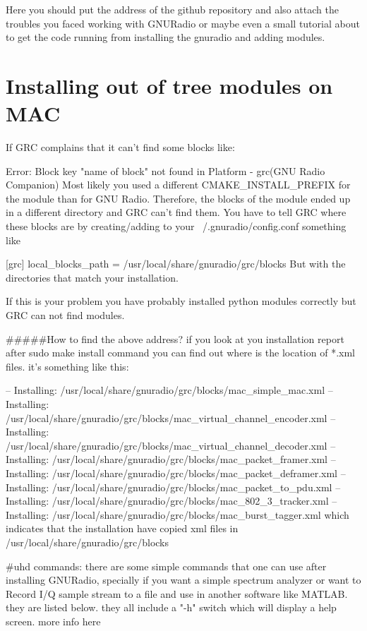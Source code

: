 \label{chapter:appendix}

Here you should put the address of the github repository and also attach the troubles you faced working with GNURadio or maybe even a small tutorial about to get the code running from installing the gnuradio and adding modules.



\section{Installing out of tree modules on MAC}

If GRC complains that it can't find some blocks like:

Error: Block key "name of block" not found in Platform - grc(GNU Radio Companion)
Most likely you used a different CMAKE_INSTALL_PREFIX for the module than for GNU Radio. Therefore, the blocks of the module ended up in a different directory and GRC can't find them. You have to tell GRC where these blocks are by creating/adding to your ~/.gnuradio/config.conf something like

[grc]
local_blocks_path = /usr/local/share/gnuradio/grc/blocks
But with the directories that match your installation.

If this is your problem you have probably installed python modules correctly but GRC can not find modules.

#####How to find the above address? if you look at you installation report after sudo make install command you can find out where is the location of *.xml files. it's something like this:

-- Installing: /usr/local/share/gnuradio/grc/blocks/mac_simple_mac.xml
-- Installing: /usr/local/share/gnuradio/grc/blocks/mac_virtual_channel_encoder.xml
-- Installing: /usr/local/share/gnuradio/grc/blocks/mac_virtual_channel_decoder.xml
-- Installing: /usr/local/share/gnuradio/grc/blocks/mac_packet_framer.xml
-- Installing: /usr/local/share/gnuradio/grc/blocks/mac_packet_deframer.xml
-- Installing: /usr/local/share/gnuradio/grc/blocks/mac_packet_to_pdu.xml
-- Installing: /usr/local/share/gnuradio/grc/blocks/mac_802_3_tracker.xml
-- Installing: /usr/local/share/gnuradio/grc/blocks/mac_burst_tagger.xml
which indicates that the installation have copied xml files in /usr/local/share/gnuradio/grc/blocks

#uhd commands: there are some simple commands that one can use after installing GNURadio, specially if you want a simple spectrum analyzer or want to Record I/Q sample stream to a file and use in another software like MATLAB. they are listed below. they all include a "-h" switch which will display a help screen. more info here

